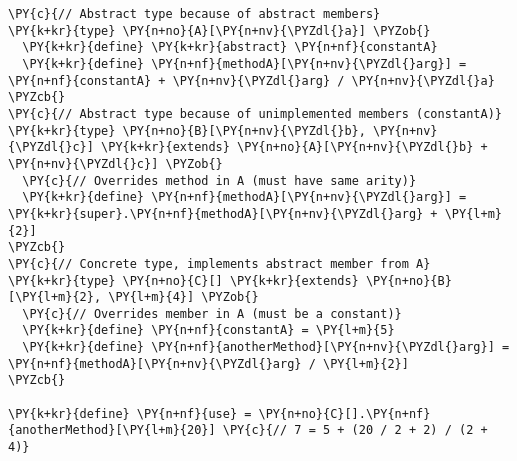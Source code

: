 \begin{Verbatim}[commandchars=\\\{\}]
\PY{c}{// Abstract type because of abstract members}
\PY{k+kr}{type} \PY{n+no}{A}[\PY{n+nv}{\PYZdl{}a}] \PYZob{}
  \PY{k+kr}{define} \PY{k+kr}{abstract} \PY{n+nf}{constantA}
  \PY{k+kr}{define} \PY{n+nf}{methodA}[\PY{n+nv}{\PYZdl{}arg}] = \PY{n+nf}{constantA} + \PY{n+nv}{\PYZdl{}arg} / \PY{n+nv}{\PYZdl{}a}
\PYZcb{}
\PY{c}{// Abstract type because of unimplemented members (constantA)}
\PY{k+kr}{type} \PY{n+no}{B}[\PY{n+nv}{\PYZdl{}b}, \PY{n+nv}{\PYZdl{}c}] \PY{k+kr}{extends} \PY{n+no}{A}[\PY{n+nv}{\PYZdl{}b} + \PY{n+nv}{\PYZdl{}c}] \PYZob{}
  \PY{c}{// Overrides method in A (must have same arity)}
  \PY{k+kr}{define} \PY{n+nf}{methodA}[\PY{n+nv}{\PYZdl{}arg}] = \PY{k+kr}{super}.\PY{n+nf}{methodA}[\PY{n+nv}{\PYZdl{}arg} + \PY{l+m}{2}]
\PYZcb{}
\PY{c}{// Concrete type, implements abstract member from A}
\PY{k+kr}{type} \PY{n+no}{C}[] \PY{k+kr}{extends} \PY{n+no}{B}[\PY{l+m}{2}, \PY{l+m}{4}] \PYZob{}
  \PY{c}{// Overrides member in A (must be a constant)}
  \PY{k+kr}{define} \PY{n+nf}{constantA} = \PY{l+m}{5}
  \PY{k+kr}{define} \PY{n+nf}{anotherMethod}[\PY{n+nv}{\PYZdl{}arg}] = \PY{n+nf}{methodA}[\PY{n+nv}{\PYZdl{}arg} / \PY{l+m}{2}]
\PYZcb{}

\PY{k+kr}{define} \PY{n+nf}{use} = \PY{n+no}{C}[].\PY{n+nf}{anotherMethod}[\PY{l+m}{20}] \PY{c}{// 7 = 5 + (20 / 2 + 2) / (2 + 4)}
\end{Verbatim}

